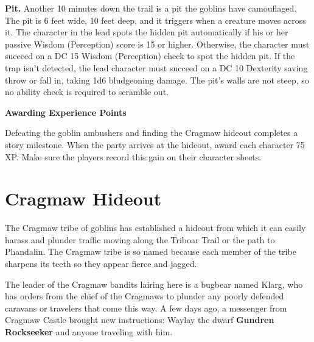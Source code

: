 \documentclass[10pt,a4paper,twoside,bg=print,twocolumn,openany,nodeprecatedcode]{dndbook}
\begin{document}
\textbf{Pit.} Another 10 minutes down the trail is a pit the goblins have camouflaged. The pit is 6 feet wide, 10 feet deep, and it triggers when a creature moves across it. The character in the lead spots the hidden pit automatically if his or her passive Wisdom (Perception) score is 15 or higher. Otherwise, the character must succeed on a DC 15 Wisdom (Perception) check to spot the hidden pit. If the trap isn't detected, the lead character must succeed on a DC 10 Dexterity saving throw or fall in, taking 1d6 bludgeoning damage. The pit's walls are not steep, so no ability check is required to scramble out.

\textbf{Awarding Experience Points}

Defeating the goblin ambushers and finding the Cragmaw hideout completes a story milestone. When the party arrives at the hideout, award each character 75 XP. Make sure the players record this gain on their character sheets.

\section{Cragmaw Hideout}
The Cragmaw tribe of goblins has established a hideout from which it can easily harass and plunder traffic moving along the Triboar Trail or the path to Phandalin. The Cragmaw tribe is so named because each member of the tribe sharpens its teeth so they appear fierce and jagged.

The leader of the Cragmaw bandits lairing here is a bugbear named Klarg, who has orders from the chief of the Cragmaws to plunder any poorly defended caravans or travelers that come this way. A few days ago, a messenger from Cragmaw Castle brought new instructions: Waylay the dwarf \textbf{Gundren Rockseeker} and anyone traveling with him.
\end{document}
